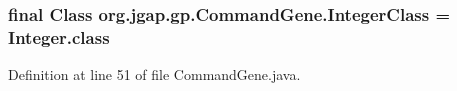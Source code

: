 \hypertarget{classorg_1_1jgap_1_1gp_1_1_command_gene_a8e354d57c541097dab355e145b048b22}{
\subsubsection[{Integer\-Class}]{\setlength{\rightskip}{0pt plus 5cm}final Class org.\-jgap.\-gp.\-Command\-Gene.\-Integer\-Class = Integer.\-class\hspace{0.3cm}{\ttfamily [static]}}}\label{classorg_1_1jgap_1_1gp_1_1_command_gene_a8e354d57c541097dab355e145b048b22}


Definition at line 51 of file Command\-Gene.\-java.



